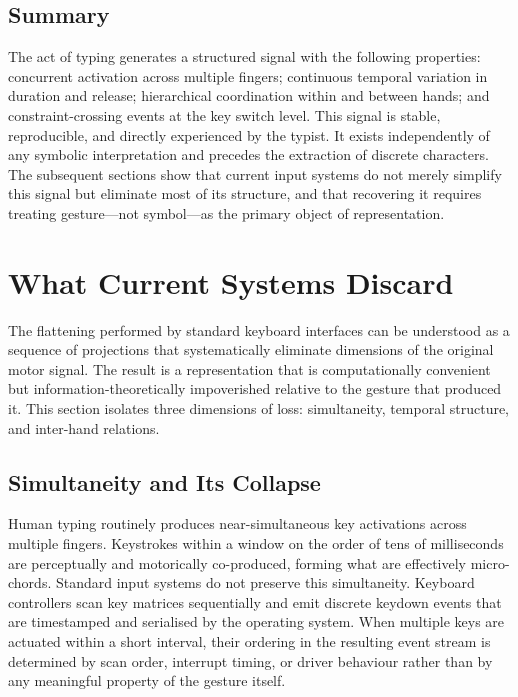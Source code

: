 \documentclass[11pt, a4paper]{article}
\begin{document}
\subsection{Summary}

The act of typing generates a structured signal with the following
properties: concurrent activation across multiple fingers; continuous
temporal variation in duration and release; hierarchical coordination
within and between hands; and constraint-crossing events at the key
switch level. This signal is stable, reproducible, and directly
experienced by the typist. It exists independently of any symbolic
interpretation and precedes the extraction of discrete characters. The
subsequent sections show that current input systems do not merely
simplify this signal but eliminate most of its structure, and that
recovering it requires treating gesture---not symbol---as the primary
object of representation.

\section{What Current Systems Discard}

The flattening performed by standard keyboard interfaces can be
understood as a sequence of projections that systematically eliminate
dimensions of the original motor signal. The result is a representation
that is computationally convenient but information-theoretically
impoverished relative to the gesture that produced it. This section
isolates three dimensions of loss: simultaneity, temporal structure, and
inter-hand relations.

\subsection{Simultaneity and Its Collapse}

Human typing routinely produces near-simultaneous key activations across
multiple fingers. Keystrokes within a window on the order of tens of
milliseconds are perceptually and motorically co-produced, forming what
are effectively micro-chords. Standard input systems do not preserve this
simultaneity. Keyboard controllers scan key matrices sequentially and
emit discrete keydown events that are timestamped and serialised by the
operating system. When multiple keys are actuated within a short
interval, their ordering in the resulting event stream is determined by
scan order, interrupt timing, or driver behaviour rather than by any
meaningful property of the gesture itself.
\end{document}
